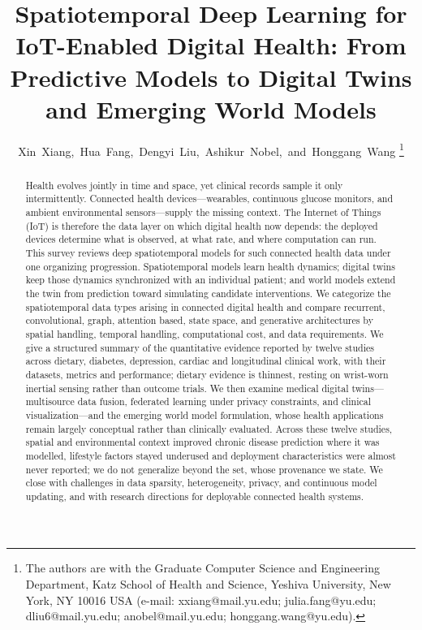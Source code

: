 \documentclass[journal]{IEEEtran}
\begin{document}
\title{Spatiotemporal Deep Learning for IoT-Enabled Digital Health: From Predictive Models to Digital Twins and Emerging World Models}

\author{Xin~Xiang,~Hua~Fang,~Dengyi~Liu,~Ashikur~Nobel,~and~Honggang~Wang%
\thanks{The authors are with the Graduate Computer Science and Engineering Department, Katz School of Health and Science, Yeshiva University, New York, NY 10016 USA (e-mail: xxiang@mail.yu.edu; julia.fang@yu.edu; dliu6@mail.yu.edu; anobel@mail.yu.edu; honggang.wang@yu.edu).}}

\maketitle

\begin{abstract}
Health evolves jointly in time and space, yet clinical records sample it only intermittently. Connected health devices---wearables, continuous glucose monitors, and ambient environmental sensors---supply the missing context. The Internet of Things (IoT) is therefore the data layer on which digital health now depends: the deployed devices determine what is observed, at what rate, and where computation can run. This survey reviews deep spatiotemporal models for such connected health data under one organizing progression. Spatiotemporal models learn health dynamics; digital twins keep those dynamics synchronized with an individual patient; and world models extend the twin from prediction toward simulating candidate interventions. We categorize the spatiotemporal data types arising in connected digital health and compare recurrent, convolutional, graph, attention based, state space, and generative architectures by spatial handling, temporal handling, computational cost, and data requirements. We give a structured summary of the quantitative evidence reported by twelve studies across dietary, diabetes, depression, cardiac and longitudinal clinical work, with their datasets, metrics and performance; dietary evidence is thinnest, resting on wrist-worn inertial sensing rather than outcome trials. We then examine medical digital twins---multisource data fusion, federated learning under privacy constraints, and clinical visualization---and the emerging world model formulation, whose health applications remain largely conceptual rather than clinically evaluated. Across these twelve studies, spatial and environmental context improved chronic disease prediction where it was modelled, lifestyle factors stayed underused and deployment characteristics were almost never reported; we do not generalize beyond the set, whose provenance we state. We close with challenges in data sparsity, heterogeneity, privacy, and continuous model updating, and with research directions for deployable connected health systems.
\end{abstract}
\end{document}
